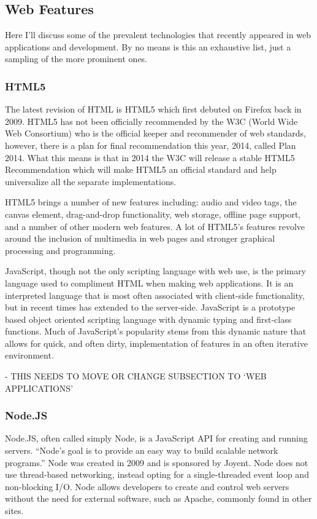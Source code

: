 \documentclass[11pt]{article}
\begin{document}
\subsection{Web Features}
Here I'll discuss some of the prevalent technologies that recently appeared in web applications and development. By no means is this an exhaustive list, just a sampling of the more prominent ones.

\subsubsection{HTML5}
The latest revision of HTML is HTML5 which first debuted on Firefox back in 2009. \cite{EvolutionOfWeb} HTML5 has not been officially recommended by the W3C (World Wide Web Consortium) who is the official keeper and recommender of web standards, however, there is a plan for final recommendation this year, 2014, called Plan 2014. \cite{Plan2014} What this means is that in 2014 the W3C will release a stable HTML5 Recommendation which will make HTML5 an official standard and help universalize all the separate implementations.

HTML5 brings a number of new features including: audio and video tags, the canvas element, drag-and-drop functionality, web storage, offline page support, and a number of other modern web features. A lot of HTML5's features revolve around the inclusion of multimedia in web pages and stronger graphical processing and programming.



JavaScript, though not the only scripting language with web use, is the primary language used to compliment HTML when making web applications. It is an interpreted language that is most often associated with client-side functionality, but in recent times has extended to the server-side. JavaScript is a prototype based object oriented scripting language with dynamic typing and first-class functions. Much of JavaScript's popularity stems from this dynamic nature that allows for quick, and often dirty, implementation of features in an often iterative environment.


- THIS NEEDS TO MOVE OR CHANGE SUBSECTION TO `WEB APPLICATIONS'
\subsubsection{Node.JS}
Node.JS, often called simply Node, is a JavaScript API for creating and running servers. ``Node's goal is to provide an easy way to build scalable network programs.'' \cite{Node} Node was created in 2009 and is sponsored by Joyent. Node does not use thread-based networking, instead opting for a single-threaded event loop and non-blocking I/O. Node allows developers to create and control web servers without the need for external software, such as Apache, commonly found in other sites.
\end{document}
